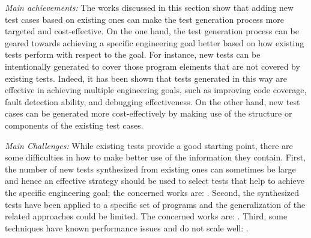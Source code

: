 \emph{Main achievements:}
The works discussed in this section show that adding new test cases based on existing ones can make the test generation process more targeted and cost-effective. 
On the one hand, the test generation process can be geared towards achieving a specific engineering goal better based on how existing tests perform with respect to the goal. 
For instance, new tests can be intentionally generated to cover those program elements that are not covered by existing tests. 
Indeed, it has been shown that tests generated in this way are effective in achieving multiple engineering goals, such as improving code coverage, fault detection ability, and debugging effectiveness. 
On the other hand, new test cases can be generated more cost-effectively by making use of the structure or components of the existing test cases. 

\emph{Main Challenges:}
While existing tests provide a good starting point, there are some difficulties in how to make better use of the information they contain.
First, the number of new tests synthesized from existing ones can sometimes be large and hence an effective strategy should be used to select tests that help to achieve the specific engineering goal;
the concerned works are: \cite{Baudry05a, Baudry05d, Yoshida2016}.
Second, the synthesized tests have been applied to a specific set of programs and the generalization of the related approaches could be limited. 
The concerned works are: \cite{tillmann2006unit, marri2010retrofitting, yoo2012, 6958388, Patrick201736, Harder03, Pacheco2005, Baudry:2006:ITS:1134285.1134299, robetaler2012isolating, Xuan:2015:CRV:2786805.2803206}.
Third, some techniques have known performance issues and do not scale well: \cite{milani2014, fraser2011generating}.
